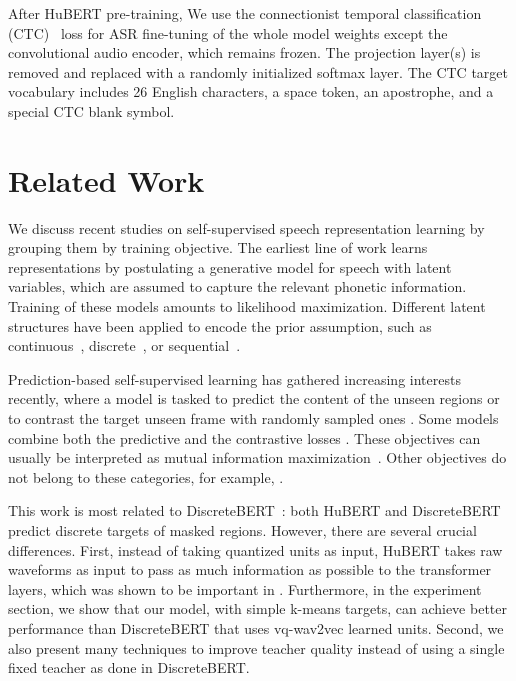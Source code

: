 After HuBERT pre-training, We use the connectionist temporal classification (CTC)~\cite{graves2006connectionist} loss for ASR fine-tuning of the whole model weights except the convolutional audio encoder, which remains frozen. The projection layer(s) is removed and replaced with a randomly initialized softmax layer. The CTC target vocabulary includes 26 English characters, a space token, an apostrophe, and a special CTC blank symbol.
\section{Related Work}
We discuss recent studies on self-supervised speech representation learning by grouping them by training objective. The earliest line of work learns representations by postulating a generative model for speech with latent variables, which are assumed to capture the relevant phonetic information. Training of these models amounts to likelihood maximization. Different latent structures have been applied to encode the prior assumption, such as continuous~\cite{hsu2017learning}, discrete~\cite{chorowski2019unsupervised,van2017neural}, or sequential~\cite{hsu2017unsupervised,ebbers2017hidden,glarner2018full,khurana2019factorial,khurana2020convolutional}. 

Prediction-based self-supervised learning has gathered increasing interests recently, where a model is tasked to predict the content of the unseen regions \cite{chung2019unsupervised, chung2020generative, chung2020improved, ling2020deep, wang2020unsupervised, liu2020mockingjay, chi2020audio, ling2020decoar} or to contrast the target unseen frame with randomly sampled ones \cite{oord2018representation, kharitonov2020data, schneider2019wav2vec, baevski2020wav2vec}. Some models combine both the predictive and the contrastive losses \cite{baevski2019vq, baevski2019effectiveness}. These objectives can usually be interpreted as mutual information maximization~\cite{tsai2020ssl_multi}. Other objectives do not belong to these categories, for example, \cite{pascual2019learning}.

This work is most related to DiscreteBERT~\cite{baevski2019effectiveness}: both HuBERT and DiscreteBERT predict discrete targets of masked regions. However, there are several crucial differences. First, instead of taking quantized units as input, HuBERT takes raw waveforms as input to pass as much information as possible to the transformer layers, which was shown to be important in \cite{baevski2020wav2vec}. Furthermore, in the experiment section, we show that our model, with simple k-means targets, can achieve better performance than DiscreteBERT that uses vq-wav2vec \cite{baevski2019vq} learned units. Second, we also present many techniques to improve teacher quality instead of using a single fixed teacher as done in DiscreteBERT.

